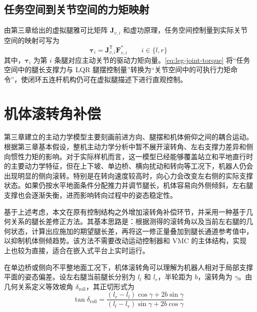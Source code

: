 \subsection{任务空间到关节空间的力矩映射}

由第三章给出的虚拟腿雅可比矩阵 $\boldsymbol{J}_{v,i}$ 和虚功原理，任务空间控制量到实际关节空间的映射可写为
\begin{equation}
  \boldsymbol{\tau}_{i}
  =
  \boldsymbol{J}_{v,i}^{\mathsf{T}}\boldsymbol{F}_{v,i}^{\ast}
  \qquad i \in \{l,r\}
  \label{eq:leg-joint-torque}
\end{equation}
其中，$\boldsymbol{\tau}_{i}$ 为第 $i$ 条腿对应主动关节的驱动力矩向量。\eqref{eq:leg-joint-torque} 将“任务空间中的腿长支撑力与 LQR 腿摆控制量”转换为“关节空间中的可执行力矩命令”，使闭环五连杆机构仍可在虚拟腿描述下进行直观控制。

\section{机体滚转角补偿}

第三章建立的主动力学模型主要刻画前进方向、腿摆和机体俯仰之间的耦合运动。根据第三章基本假设，整机主动力学分析中暂不展开滚转角、左右支撑力差异和侧向惯性力矩的影响。对于实际样机而言，这一模型已经能够覆盖站立和平地直行时的主要动力学特征，但在上下坡、单边桥、横向扰动和转向等工况下，机器人仍会出现明显的侧向滚转。特别是在转向速度较高时，向心力会改变左右侧的实际支撑状态。如果仍按水平地面条件分配推力并调节腿长，机体容易向外侧倾斜，左右腿支撑也会逐渐失衡，进而影响转向过程中的姿态稳定性。

基于上述考虑，本文在原有控制结构之外增加滚转角补偿环节，并采用一种基于几何关系的腿长差修正方法。其基本思路是：根据测得的滚转角以及当前左右腿的几何状态，计算出应施加的期望腿长差，再将这一修正量叠加到腿长通道参考值中，以抑制机体侧倾趋势。该方法不需要改动运动控制器和 VMC 的主体结构，实现上也较为直接，适合在嵌入式平台上实时运行。

在单边桥或侧向不平整地面工况下，机体滚转角可以理解为机器人相对于局部支撑平面的姿态偏差。设左右腿当前腿长分别为 $l_l$ 和 $l_r$，半轮距为 $b$，滚转角为 $\gamma$。由几何关系定义等效坡角 $\delta_{\mathrm{roll}}$，其正切形式为
\begin{equation}
  \tan \delta_{\mathrm{roll}}
  =
  \frac{
    (l_r-l_l)\cos\gamma + 2b\sin\gamma
  }{
    (l_l-l_r)\sin\gamma + 2b\cos\gamma
  }
  \label{eq:roll-delta}
\end{equation}

